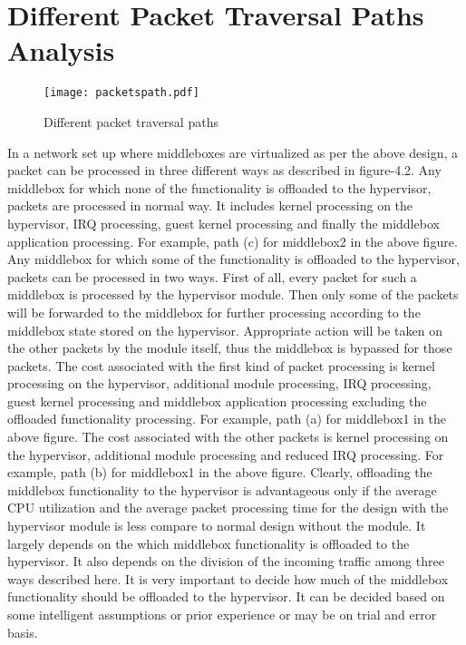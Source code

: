 \documentclass[a4paper,11pt]{report}
\begin{document}
\section{Different Packet Traversal Paths Analysis}
\begin{figure}[h]
\centering
\texttt{[image: packetspath.pdf]}
\caption{Different packet traversal paths}
\end{figure}
In a network set up where middleboxes are virtualized as per the above design, a packet can be processed in three different ways as described in figure-4.2. Any middlebox for which none of the functionality is offloaded to the hypervisor, packets are processed in normal way. It includes kernel processing on the hypervisor, IRQ processing, guest kernel processing and finally the middlebox application processing. For example, path (c) for middlebox2 in the above figure. Any middlebox for which some of the functionality is offloaded to the hypervisor, packets can be processed in two ways. First of all, every packet for such a middlebox is processed by the hypervisor module. Then only some of the packets will be forwarded to the middlebox for further processing according to the middlebox state stored on the hypervisor. Appropriate action will be taken on the other packets by the module itself, thus the middlebox is bypassed for those packets. The cost associated with the first kind of packet processing is kernel processing on the hypervisor, additional module processing, IRQ processing, guest kernel processing and middlebox application processing excluding the offloaded functionality processing. For example, path (a) for middlebox1 in the above figure. The cost associated with the other packets is kernel processing on the hypervisor, additional module processing and reduced IRQ processing. For example, path (b) for middlebox1 in the above figure. Clearly, offloading the middlebox functionality to the hypervisor is advantageous only if the average CPU utilization and the average packet processing time for the design with the hypervisor module is less compare to normal design without the module. It largely depends on the which middlebox functionality is offloaded to the hypervisor. It also depends on the division of the incoming traffic among three ways described here. It is very important to decide how much of the middlebox functionality should be offloaded to the hypervisor. It can be decided based on some intelligent assumptions or prior experience or may be on trial and error basis.

\end{document}
